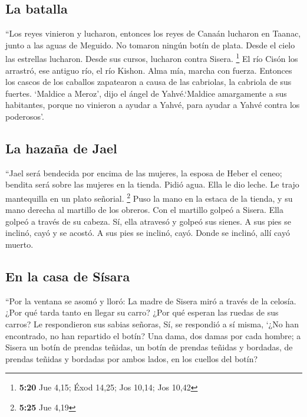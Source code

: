 \hypertarget{la-batalla}{%
\subsection{La batalla}\label{la-batalla}}

 ``Los reyes vinieron y lucharon, entonces los reyes de
Canaán lucharon en Taanac, junto a las aguas de Meguido. No tomaron
ningún botín de plata.  Desde el cielo las estrellas
lucharon. Desde sus cursos, lucharon contra Sisera. \footnote{\textbf{5:20}
  Jue 4,15; Éxod 14,25; Jos 10,14; Jos 10,42}  El río
Cisón los arrastró, ese antiguo río, el río Kishon. Alma mía, marcha con
fuerza.  Entonces los cascos de los caballos zapatearon a
causa de las cabriolas, la cabriola de sus fuertes. 
`Maldice a Meroz', dijo el ángel de Yahvé.`Maldice amargamente a sus
habitantes, porque no vinieron a ayudar a Yahvé, para ayudar a Yahvé
contra los poderosos'.

\hypertarget{la-hazauxf1a-de-jael}{%
\subsection{La hazaña de Jael}\label{la-hazauxf1a-de-jael}}

 ``Jael será bendecida por encima de las mujeres, la
esposa de Heber el ceneo; bendita será sobre las mujeres en la tienda.
 Pidió agua. Ella le dio leche. Le trajo mantequilla en
un plato señorial. \footnote{\textbf{5:25} Jue 4,19} 
Puso la mano en la estaca de la tienda, y su mano derecha al martillo de
los obreros. Con el martillo golpeó a Sisera. Ella golpeó a través de su
cabeza. Sí, ella atravesó y golpeó sus sienes.  A sus
pies se inclinó, cayó y se acostó. A sus pies se inclinó, cayó. Donde se
inclinó, allí cayó muerto.

\hypertarget{en-la-casa-de-suxedsara}{%
\subsection{En la casa de Sísara}\label{en-la-casa-de-suxedsara}}

 ``Por la ventana se asomó y lloró: La madre de Sisera
miró a través de la celosía. ¿Por qué tarda tanto en llegar su carro?
¿Por qué esperan las ruedas de sus carros?  Le
respondieron sus sabias señoras, Sí, se respondió a sí misma,
 `¿No han encontrado, no han repartido el botín? Una
dama, dos damas por cada hombre; a Sisera un botín de prendas teñidas,
un botín de prendas teñidas y bordadas, de prendas teñidas y bordadas
por ambos lados, en los cuellos del botín?

